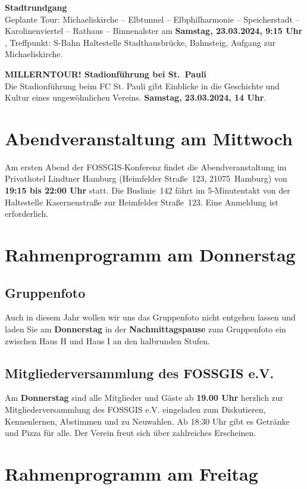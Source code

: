 \noindent
{\large \bfseries Stadtrundgang}\\
Geplante Tour: Michaeliskirche – Elbtunnel – Elbphilharmonie – Speicherstadt – Karolinenviertel – Rathaus – Binnenalster am {\bfseries Samstag, 23.03.2024, 9:15 Uhr }, Treffpunkt: S-Bahn Haltestelle Stadthausbrücke, Bahnsteig, Aufgang zur Michaeliskirche.
\bigskip

\noindent
{\large \bfseries MILLERNTOUR! Stadionführung bei St.~Pauli}\\
Die Stadionführung beim FC St. Pauli gibt Einblicke in die Geschichte und Kultur eines ungewöhnlichen Vereins. {\bfseries Samstag, 23.03.2024, 14 Uhr}.

\section*{Abendveranstaltung am Mittwoch}\label{schwaetzli}
Am ersten Abend der FOSSGIS-Konferenz findet die Abendveranstaltung im Privathotel Lindtner Hamburg (Heimfelder Straße~123, 21075~Hamburg) von {\bfseries 19:15 bis 22:00 Uhr} statt. Die Buslinie~142 fährt im 5-Minutentakt von der Haltestelle Kasernenstraße zur Heimfelder Straße~123. Eine Anmeldung ist erforderlich.

\section*{Rahmenprogramm am Donnerstag}
\subsection*{Gruppenfoto}
Auch in diesem Jahr wollen wir uns das Gruppenfoto nicht entgehen lassen und laden Sie am {\bfseries Donnerstag} in der {\bfseries Nachmittagspause} zum Gruppenfoto ein zwischen Haus H und Haus I an den halbrunden Stufen.

\subsection*{Mitgliederversammlung des FOSSGIS e.V.}
Am {\bfseries Donnerstag} sind alle Mitglieder und Gäste ab {\bfseries 19.00 Uhr} herzlich zur Mitgliederversammlung des FOSSGIS e.V. eingeladen zum Diskutieren, Kennenlernen, Abstimmen und zu Neuwahlen. Ab 18:30 Uhr
gibt es Getränke und Pizza für alle. Der Verein freut sich über zahlreiches Erscheinen.

\section*{Rahmenprogramm am Freitag}
